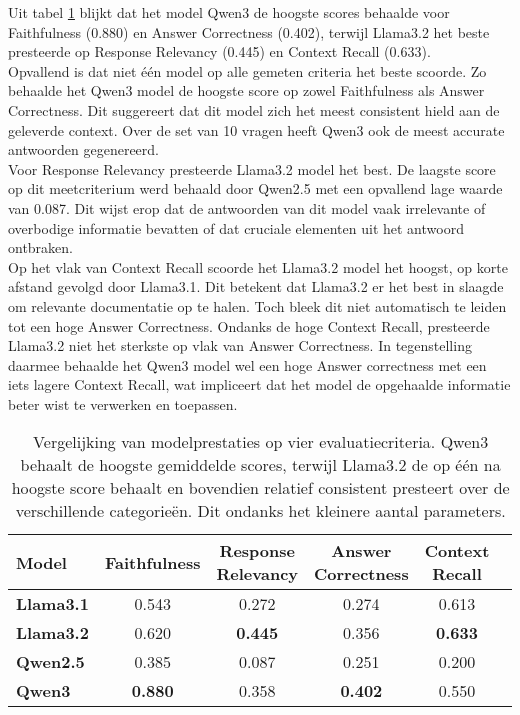 Uit tabel \ref{tab:modelvergelijking} blijkt dat het model Qwen3 de hoogste scores behaalde voor Faithfulness (0.880) en Answer Correctness (0.402), terwijl Llama3.2 het beste presteerde op Response Relevancy (0.445) en Context Recall (0.633). 
\\[1em]
Opvallend is dat niet één model op alle gemeten criteria het beste scoorde. Zo behaalde het Qwen3 model de hoogste score op zowel Faithfulness als Answer Correctness. Dit suggereert dat dit model zich het meest consistent hield aan de geleverde context. Over de set van 10 vragen heeft Qwen3 ook de meest accurate antwoorden gegenereerd.
\\[1em]
Voor Response Relevancy presteerde Llama3.2 model het best. De laagste score op dit meetcriterium werd behaald door Qwen2.5 met een opvallend lage waarde van 0.087. Dit wijst erop dat de antwoorden van dit model vaak irrelevante of overbodige informatie bevatten of dat cruciale elementen uit het antwoord ontbraken.
\\[1em]
Op het vlak van Context Recall scoorde het Llama3.2 model het hoogst, op korte afstand gevolgd door Llama3.1. Dit betekent dat Llama3.2 er het best in slaagde om relevante documentatie op te halen. Toch bleek dit niet automatisch te leiden tot een hoge Answer Correctness. Ondanks de hoge Context Recall, presteerde Llama3.2 niet het sterkste op vlak van Answer Correctness. In tegenstelling daarmee behaalde het Qwen3 model wel een hoge Answer correctness met een iets lagere Context Recall, wat impliceert dat het model de opgehaalde informatie beter wist te verwerken en toepassen.

\begin{table}[H]
    \begin{tabular}{|l|c|c|c|c|c|}
        \hline
        \textbf{Model} & \textbf{Faithfulness} & \textbf{Response Relevancy} & \textbf{Answer Correctness} & \textbf{Context Recall} \\
        \hline
        \textbf{Llama3.1} & 0.543 & 0.272 & 0.274 & 0.613 \\
        \textbf{Llama3.2} & 0.620 & \textbf{0.445} & 0.356 & \textbf{0.633} \\
        \textbf{Qwen2.5}  & 0.385 & 0.087 & 0.251 & 0.200 \\
        \textbf{Qwen3}    & \textbf{0.880} & 0.358 & \textbf{0.402} & 0.550 \\
        \hline
    \end{tabular}
    \caption{Vergelijking van modelprestaties op vier evaluatiecriteria. Qwen3 behaalt de hoogste gemiddelde scores, terwijl Llama3.2 de op één na hoogste score behaalt en bovendien relatief consistent presteert over de verschillende categorieën. Dit ondanks het kleinere aantal parameters.}
    \label{tab:modelvergelijking}
\end{table}

